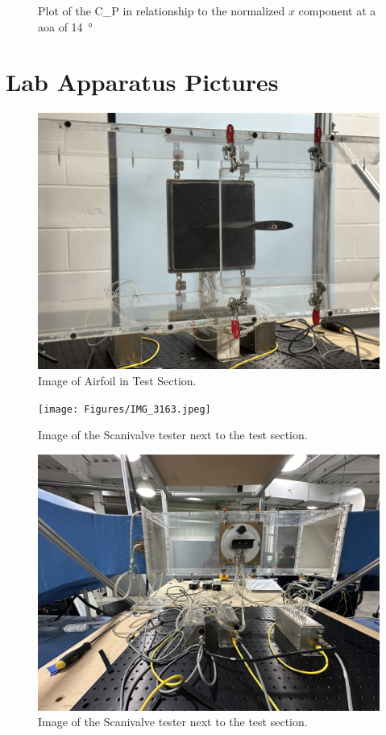 \begin{figure}[htpb]
    \centering
    
    \caption[Plot of the Coefficient of pressure in relationship to the normalized x component at a Angle of attack of 14 degrees]{Plot of the \gls{C_P} in relationship to the normalized $x$ component at a \acrshort{aoa} of \qty{14} {\degree}}
    \label{fig:C_P vs. 14° Angle of Attack.svg}
\end{figure}

\section{Lab Apparatus Pictures}

\begin{figure}[htpb]
    \centering
    \includegraphics[width=0.75\linewidth]{Figures/IMG_3161.jpeg}
    \caption[Image of Airfoil in Test Section.]{Image of Airfoil in Test Section.}
    \label{fig: AirfoilTestSection_back}
\end{figure}

\begin{figure}[htpb]
    \centering
    \texttt{[image: Figures/IMG\_3163.jpeg]}
    \caption[Image of the Scanivalve tester next to the test section.]{Image of the Scanivalve tester next to the test section.}
    \label{fig: scanivalve_top}
\end{figure}

\begin{figure}[htpb]
    \centering
    \includegraphics[width=0.75\linewidth]{Figures/IMG_3164.jpeg}
    \caption[Image of the Scanivalve tester next to the test section.]{Image of the Scanivalve tester next to the test section.}
    \label{fig: AirfoilTestSection_top}
\end{figure}